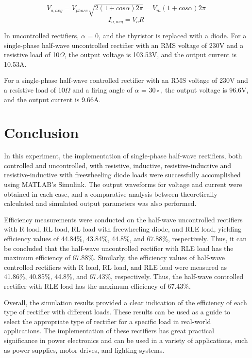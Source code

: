 $$
    V_{o,avg} =
    V_{phase}
    \sqrt{2(1 + cos\alpha)2\pi} =
    V_m(1 + cos\alpha)
    2\pi
$$
$$
    I_{o,avg} =
    V_oR
$$

In uncontrolled rectifiers, $ \alpha$ = 0, and the thyristor is replaced with a diode.
For a single-phase half-wave uncontrolled rectifier with an RMS voltage of 230V
and a resistive load of 10$ \Omega $,
the output voltage is 103.53V, and the output current is 10.53A.

For a single-phase half-wave controlled rectifier with an RMS voltage of 230V
and a resistive load of 10$ \Omega $ and a firing angle of $ \alpha  $ = 30◦, the output voltage
is 96.6V, and the output current is 9.66A.

\pagebreak











\section{Conclusion}


\hspace{\parindent}

In this experiment, the implementation of single-phase half-wave rectifiers, both controlled and uncontrolled, with resistive, inductive, resistive-inductive and resistive-inductive with freewheeling diode loads were successfully accomplished using MATLAB's Simulink. The output waveforms for voltage and current were obtained in each case, and a comparative analysis between theoretically calculated and simulated output parameters was also performed.

Efficiency measurements were conducted on the half-wave uncontrolled rectifiers with R load, RL load, RL load with freewheeling diode, and RLE load, yielding efficiency values of 44.84\%, 43.84\%, 44.8\%, and 67.88\%, respectively. Thus, it can be concluded that the half-wave uncontrolled rectifier with RLE load has the maximum efficiency of 67.88\%. Similarly, the efficiency values of half-wave controlled rectifiers with R load, RL load, and RLE load were measured as 41.86\%, 40.85\%, 44.8\%, and 67.43\%, respectively. Thus, the half-wave controlled rectifier with RLE load has the maximum efficiency of 67.43\%.

Overall, the simulation results provided a clear indication of the efficiency of each type of rectifier with different loads. These results can be used as a guide to select the appropriate type of rectifier for a specific load in real-world applications. The implementation of these rectifiers has great practical significance in power electronics and can be used in a variety of applications, such as power supplies, motor drives, and lighting systems.
\pagebreak
